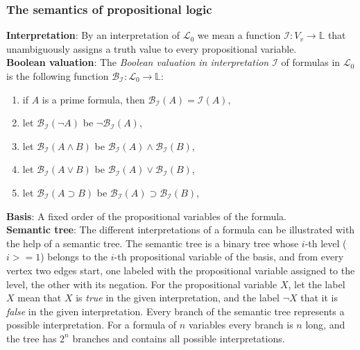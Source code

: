 \documentclass[margin=0px]{article}
\begin{document}
\subsubsection{The semantics of propositional logic}

\noindent \textbf{Interpretation}: By an interpretation of $\mathcal{L}_{0}$ we mean a function $\mathcal{I} : V_{v} \to \mathbb{L}$ that unambiguously assigns a truth value to every propositional variable.\\

\noindent \textbf{Boolean valuation}: The \textit{Boolean valuation in interpretation $\mathcal{I}$} of formulas in $\mathcal{L}_{0}$ is the following function $\mathcal{B}_{\mathcal{I}} : \mathcal{L}_{0} \to \mathbb{L}$:

\begin{enumerate}
    \item if $A$ is a prime formula, then $\mathcal{B}_{\mathcal{I}}(A) = \mathcal{I}(A)$,

    \item let $\mathcal{B}_{\mathcal{I}}(\neg A)$ be $\neg \mathcal{B}_{\mathcal{I}}(A) $,

    \item let $\mathcal{B}_{\mathcal{I}}(A \wedge B)$ be $\mathcal{B}_{\mathcal{I}}(A) \wedge \mathcal{B}_{\mathcal{I}}(B)$,

    \item let $\mathcal{B}_{\mathcal{I}}(A \vee B)$ be $\mathcal{B}_{\mathcal{I}}(A) \vee \mathcal{B}_{\mathcal{I}}(B)$,

    \item let $\mathcal{B}_{\mathcal{I}}(A \supset B)$ be $\mathcal{B}_{\mathcal{I}}(A) \supset \mathcal{B}_{\mathcal{I}}(B)$,
\end{enumerate}

\noindent \textbf{Basis}: A fixed order of the propositional variables of the formula.\\

\noindent \textbf{Semantic tree}: The different interpretations of a formula can be illustrated with the help of a semantic tree. The semantic
tree is a binary tree whose $i$-th level ($i>=1$) belongs to the $i$-th propositional variable of the basis, and from every vertex two edges start, one
labeled with the propositional variable assigned to the level, the other with its negation. For the propositional variable $X$, let the label $X$ mean that $X$ is \textit{true} in the given interpretation, and the label $\neg X$ that it is \textit{false} in the given interpretation. Every branch of the semantic tree
represents a possible interpretation. For a formula of $n$ variables every branch is $n$ long, and the tree has $2^{n}$ branches and contains all possible interpretations.
\end{document}

